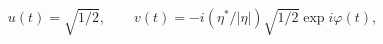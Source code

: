 \begin{equation}
u(t)=\sqrt{1/2}, \quad \quad v(t)=-i(\eta^{*}/|\eta|)\sqrt{1/2}
\exp i\varphi(t),
\label{w}
\end{equation}

